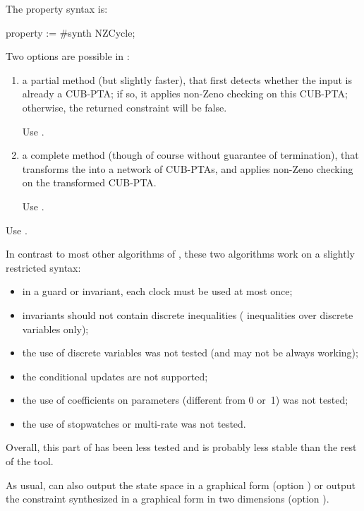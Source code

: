 The property syntax is:

\begin{IMITATORproperty}
property := #synth NZCycle;
\end{IMITATORproperty}

Two options are possible in \imitator{}:
\begin{enumerate}
	\item a partial method (but slightly faster), that first detects whether the input \NIPTA{} is already a CUB-PTA; if so, it applies non-Zeno checking on this CUB-PTA; otherwise, the returned constraint will be false.

	      Use .

	\item a complete method (though of course without guarantee of termination), that transforms the \NIPTA{} into a network of CUB-PTAs, and applies non-Zeno checking on the transformed CUB-PTA.

	      Use .

\end{enumerate}

	      Use .

\begin{becareful}[restrictions]
	In contrast to most other algorithms of \imitator{}, these two algorithms work on a slightly restricted syntax:
	\begin{itemize}
		\item in a guard or invariant, each clock must be used at most once;
		\item invariants should not contain discrete inequalities (\ie{} inequalities over discrete variables only);
		\item the use of discrete variables was not tested (and may not be always working);
		\item the conditional updates are not supported;
		\item the use of coefficients on parameters (different from 0 or~1) was not tested;
		\item the use of stopwatches or multi-rate was not tested.
	\end{itemize}
	Overall, this part of \imitator{} has been less tested and is probably less stable than the rest of the tool.
\end{becareful}

As usual, \imitator{} can also
output the state space in a graphical form (option )
or
output the constraint synthesized in a graphical form in two dimensions (option ).

